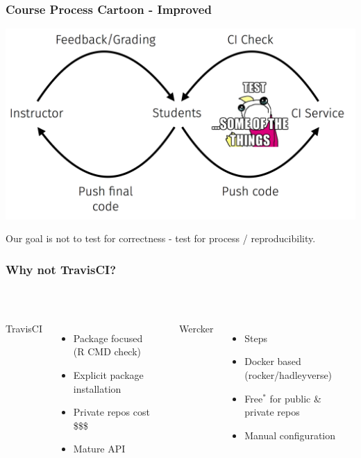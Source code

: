 \documentclass[12pt]{beamer}
\begin{document}
\begin{frame}
\frametitle{Course Process Cartoon - Improved}

\begin{center}
\includegraphics[width=\textwidth]{imgs/cycle_ci_meme.png}
\end{center}

Our goal is not to test for correctness - test for process / reproducibility.

\end{frame}


\begin{frame}[t]
\frametitle{Why not TravisCI?}

~\\ \vspace{-8mm}

\begin{columns}[t]
{\Large TravisCI}
{\small
\begin{itemize}
\item Package focused \\(R CMD check)
\item Explicit package installation
\item Private repos cost \$\$\$
\item Mature API
\end{itemize}
}

{\Large Wercker}
{\small
\begin{itemize}
\item Steps
\item Docker based (rocker/hadleyverse)
\item Free$^*$ for public \& \\ private repos
\item Manual configuration
\end{itemize}
}

\end{columns}

\end{frame}
\end{document}
